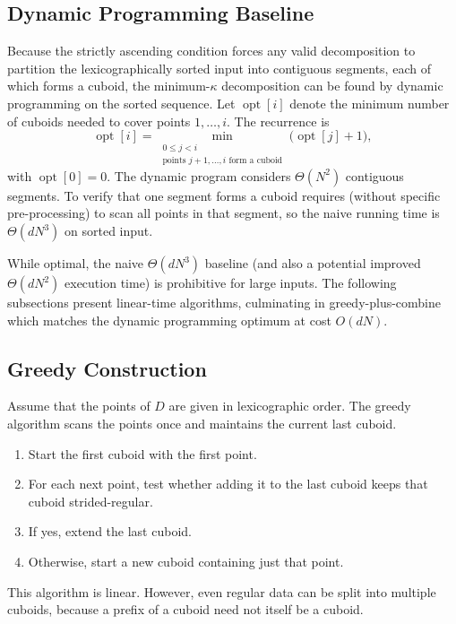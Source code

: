 \documentclass[manuscript,screen,review]{acmart}
\theoremstyle{definition}
\theoremstyle{plain}
\begin{document}
\subsection{Dynamic Programming Baseline}

Because the strictly ascending condition forces any valid decomposition to partition the lexicographically sorted input into contiguous segments, each of which forms a cuboid, the minimum-$\kappa$ decomposition can be found by dynamic programming on the sorted sequence. Let $\operatorname{opt}[i]$ denote the minimum number of cuboids needed to cover points $1, \ldots, i$. The recurrence is
\[
  \operatorname{opt}[i] = \min_{\substack{0 \leq j < i \\ \text{points } j{+}1, \ldots, i \text{ form a cuboid}}} \bigl(\operatorname{opt}[j] + 1\bigr),
\]
with $\operatorname{opt}[0] = 0$. The dynamic program considers $\Theta(N^2)$ contiguous segments. To verify that one segment forms a cuboid requires (without specific pre-processing) to scan all points in that segment, so the naive running time is $\Theta(dN^3)$ on sorted input.

While optimal, the naive $\Theta(dN^3)$ baseline (and also a potential improved $\Theta(dN^2)$ execution time) is prohibitive for large inputs. The following subsections present linear-time algorithms, culminating in greedy-plus-combine which matches the dynamic programming optimum at cost $O(dN)$.

\subsection{Greedy Construction}

Assume that the points of $D$ are given in lexicographic order. The
greedy algorithm scans the points once and maintains the current last cuboid.
\begin{enumerate}[leftmargin=*]
  \item Start the first cuboid with the first point.
  \item For each next point, test whether adding it to the last cuboid keeps that cuboid strided-regular.
  \item If yes, extend the last cuboid.
  \item Otherwise, start a new cuboid containing just that point.
\end{enumerate}

This algorithm is linear. However, even regular data can be split into multiple cuboids, because a prefix of a cuboid need not itself be a cuboid.
\end{document}
